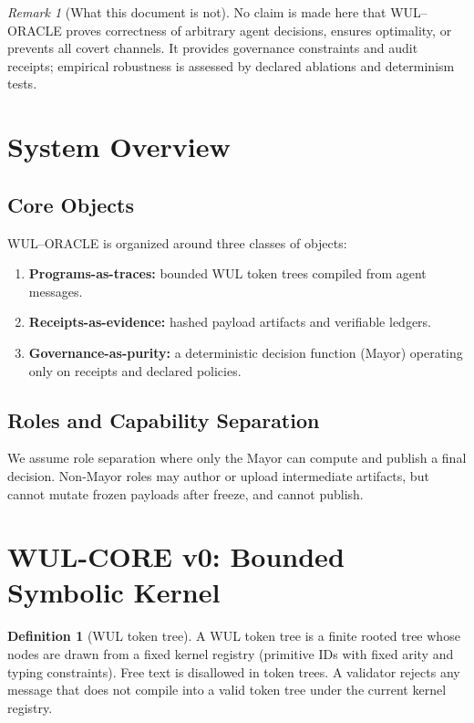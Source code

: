 \documentclass[11pt,a4paper]{article}
\theoremstyle{plain}
\theoremstyle{definition}
\newtheorem{definition}[theorem]{Definition}
\theoremstyle{remark}
\newtheorem{remark}[theorem]{Remark}
\begin{document}
\begin{remark}[What this document is not]
No claim is made here that WUL--ORACLE proves correctness of arbitrary agent decisions, ensures optimality, or prevents all covert channels. It provides governance constraints and audit receipts; empirical robustness is assessed by declared ablations and determinism tests.
\end{remark}

\section{System Overview}

\subsection{Core Objects}
WUL--ORACLE is organized around three classes of objects:
\begin{enumerate}[label=(\alph*)]
  \item \textbf{Programs-as-traces:} bounded WUL token trees compiled from agent messages.
  \item \textbf{Receipts-as-evidence:} hashed payload artifacts and verifiable ledgers.
  \item \textbf{Governance-as-purity:} a deterministic decision function (Mayor) operating only on receipts and declared policies.
\end{enumerate}

\subsection{Roles and Capability Separation}
We assume role separation where only the Mayor can compute and publish a final decision. Non-Mayor roles may author or upload intermediate artifacts, but cannot mutate frozen payloads after freeze, and cannot publish.

\section{WUL-CORE v0: Bounded Symbolic Kernel}

\begin{definition}[WUL token tree]
A WUL token tree is a finite rooted tree whose nodes are drawn from a fixed kernel registry (primitive IDs with fixed arity and typing constraints). Free text is disallowed in token trees. A validator rejects any message that does not compile into a valid token tree under the current kernel registry.
\end{definition}
\end{document}
